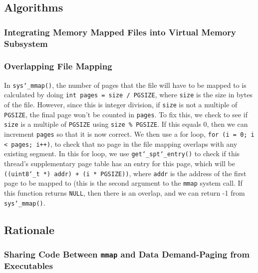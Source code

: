 \documentclass{article}
\renewcommand{\_}{\char`_}
\begin{document}
\subsection{Algorithms}

\subsubsection{Integrating Memory Mapped Files into Virtual Memory Subsystem}

\subsubsection{Overlapping File Mapping}

In \texttt{sys\_mmap()}, the number of pages that the file will have to be mapped to is calculated by doing \texttt{int pages = size / PGSIZE}, where \texttt{size} is the size in bytes of the file. However, since this is integer division, if \texttt{size} is not a multiple of \texttt{PGSIZE}, the final page won't be counted in \texttt{pages}. To fix this, we check to see if \texttt{size} is a multiple of \texttt{PGSIZE} using \texttt{size \% PGSIZE}. If this equals 0, then we can increment \texttt{pages} so that it is now correct. We then use a for loop, \texttt{for (i = 0; i < pages; i++)}, to check that no page in the file mapping overlaps with any existing segment. In this for loop, we use \texttt{get\_spt\_entry()} to check if this thread's supplementary page table has an entry for this page, which will be \texttt{((uint8\_t *) addr) + (i * PGSIZE))}, where \texttt{addr} is the address of the first page to be mapped to (this is the second argument to the \texttt{mmap} system call. If this function returns \texttt{NULL}, then there is an overlap, and we can return -1 from \texttt{sys\_mmap()}.

\subsection{Rationale}

\subsubsection{Sharing Code Between \texttt{mmap} and Data Demand-Paging from Executables}
\end{document}
